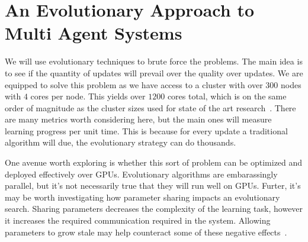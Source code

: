 
\section{An Evolutionary Approach to Multi Agent Systems}
\label{sec:direction3}
We will use evolutionary techniques to brute force the problems.
The main idea is to see if the quantity of updates will prevail over the quality over updates.
We are equipped to solve this problem as we have access to a cluster with over $300$ nodes with $4$ cores per node.
This yields over $1200$ cores total, which is on the same order of magnitude as the cluster sizes used for state of the art research~\cite{salimans2017evolution}.
There are many metrics worth considering here, but the main ones will measure learning progress per unit time.
This is because for every update a traditional algorithm will due, the evolutionary strategy can do thousands.

One avenue worth exploring is whether this sort of problem can be optimized and deployed effectively over GPUs.
Evolutionary algorithms are embarassingly parallel, but it's not necessarily true that they will run well on GPUs.
Furter, it’s may be worth investigating how parameter sharing impacts an evolutionary search.
Sharing parameters decreases the complexity of the learning task, however it increases the required communication required in the system.
Allowing parameters to grow stale may help counteract some of these negative effects~\cite{cui2014exploiting}.

